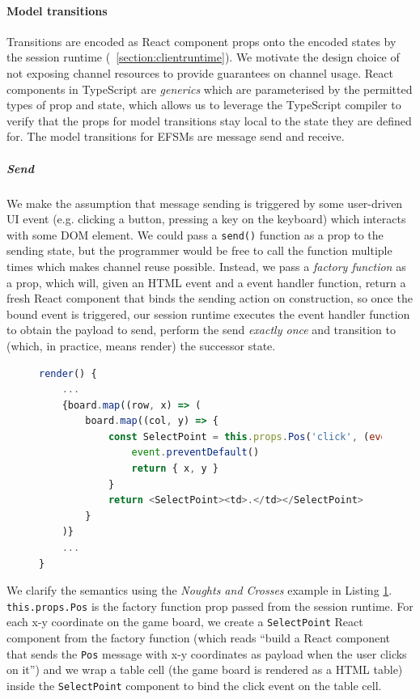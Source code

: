 \documentclass[submission,copyright,creativecommons]{eptcs}
\newcommand{\sectionref}[1]{\textsection~\ref{#1}}
\begin{document}
\paragraph{Model transitions} Transitions are encoded as React component props onto the encoded states by the session runtime (\sectionref{section:clientruntime}). We motivate the design choice of not exposing channel resources to provide guarantees on channel usage. React components in TypeScript are \textit{generics} \cite{TypeScriptSpec} which are parameterised by the permitted types of prop and state, which allows us to leverage the TypeScript compiler to verify that the props for model transitions stay local to the state they are defined for. The model transitions for EFSMs are message send and receive.

\subparagraph{Send} We make the assumption that message sending is triggered by some user-driven UI event (e.g. clicking a button, pressing a key on the keyboard) which interacts with some DOM element. We could pass a \texttt{send()} function as a prop to the sending state, but the programmer would be free to call the function multiple times which makes channel reuse possible. Instead, we pass a \textit{factory function} as a prop, which will, given an HTML event and a event handler function, return a fresh React component that binds the sending action on construction, so once the bound event is triggered, our session runtime executes the event handler function to obtain the payload to send, perform the send \textit{exactly once} and transition to (which, in practice, means render) the successor state. 

\begin{figure}[!h]
\begin{lstlisting}[language=JavaScript, tabsize=4]
render() {
	...
	{board.map((row, x) => (
		board.map((col, y) => {
			const SelectPoint = this.props.Pos('click', (event: UIEvent) => {
				event.preventDefault()
				return { x, y }
			}
			return <SelectPoint><td>.</td></SelectPoint>
		}
	)}
	...	
}
\end{lstlisting}  
\label{lst:clientapp}
\end{figure}

We clarify the semantics using the \textit{Noughts and Crosses} example in Listing \ref{lst:clientapp}. \texttt{this.props.Pos} is the factory function prop passed from the session runtime. For each x-y coordinate on the game board, we create a \texttt{SelectPoint} React component from the factory function (which reads ``build a React component that sends the \texttt{Pos} message with x-y coordinates as payload when the user clicks on it'') and we wrap a table cell (the game board is rendered as a HTML table) inside the \texttt{SelectPoint} component to bind the click event on the table cell.
\end{document}

